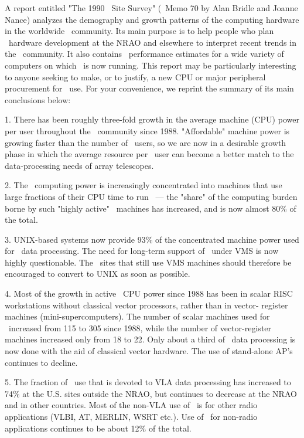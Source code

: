 A report entitled "The 1990 \AIPS\  Site Survey" (\AIPS\  Memo 70 by Alan
Bridle and Joanne Nance) analyzes the demography and growth patterns of
the computing hardware in the worldwide \AIPS\  community.  Its main
purpose is to help people who plan \AIPS\  hardware development at the NRAO
and elsewhere to interpret recent trends in the \AIPS\  community.  It also
contains \AIPS\  performance estimates for a wide variety of computers on
which \AIPS\  is now running.  This report may be particularly interesting
to anyone seeking to make, or to justify, a new CPU or major peripheral
procurement for \AIPS\  use.  For your convenience, we reprint the summary
of its main conclusions below:

1.  There has been roughly three-fold growth in the average machine
(CPU) power per user throughout the \AIPS\  community since 1988.
"Affordable" machine power is growing faster than the number of \AIPS\
users, so we are now in a desirable growth phase in which the average
resource per \AIPS\  user can become a better match to the data-processing
needs of array telescopes.

2.  The \AIPS\  computing power is increasingly concentrated into machines
that use large fractions of their CPU time to run \AIPS\  --- the "share"
of the computing burden borne by such "highly active" \AIPS\  machines has
increased, and is now almost 80\% of the total.

3.  UNIX-based systems now provide 93\% of the concentrated machine power
used for \AIPS\  data processing.  The need for long-term support of \AIPS\
under VMS is now highly questionable.  The \AIPS\  sites that still use VMS
machines should therefore be encouraged to convert to UNIX as soon as
possible.

4.  Most of the growth in active \AIPS\  CPU power since 1988 has been in
scalar RISC workstations without classical vector processors, rather
than in vector- register machines (mini-supercomputers).  The number of
scalar machines used for \AIPS\  increased from 115 to 305 since 1988,
while the number of vector-register machines increased only from 18 to
22.  Only about a third of \AIPS\  data processing is now done with the aid
of classical vector hardware.  The use of stand-alone AP's continues to
decline.

5.  The fraction of \AIPS\  use that is devoted to VLA data processing has
increased to 74\% at the U.S.  sites outside the NRAO, but continues to
decrease at the NRAO and in other countries.  Most of the non-VLA use of
\AIPS\  is for other radio applications (VLBI, AT, MERLIN, WSRT etc.).  Use
of \AIPS\  for non-radio applications continues to be about 12\% of the
total.

